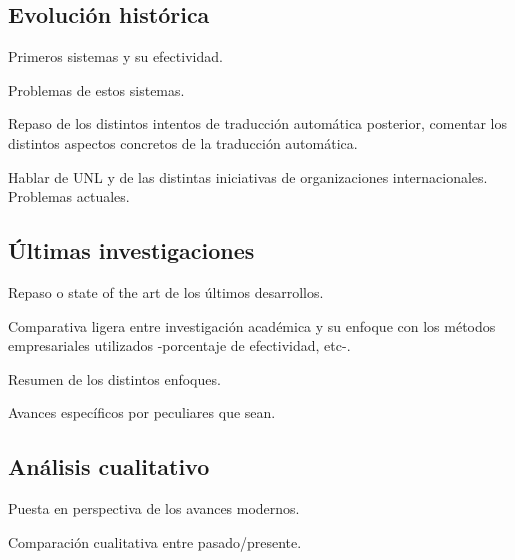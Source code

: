 \subsection{Evolución histórica}
Primeros sistemas y su efectividad.

Problemas de estos sistemas.

Repaso de los distintos intentos de traducción automática posterior, comentar
los distintos aspectos concretos de la traducción automática.

Hablar de UNL y de las distintas iniciativas de organizaciones internacionales.
Problemas actuales.

\subsection{Últimas investigaciones}
Repaso o state of the art de los últimos desarrollos.

Comparativa ligera entre investigación académica y su enfoque con los métodos
empresariales utilizados -porcentaje de efectividad, etc-.

Resumen de los distintos enfoques.

Avances específicos por peculiares que sean.

\subsection{Análisis cualitativo}
Puesta en perspectiva de los avances modernos.

Comparación cualitativa entre pasado/presente.